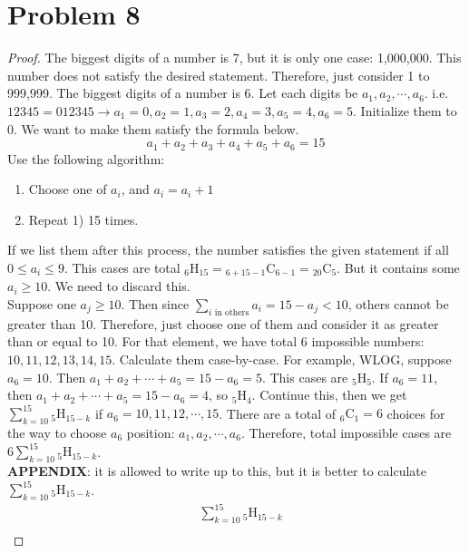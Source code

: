 \section*{Problem 8}
	\begin{proof}
		The biggest digits of a number is 7, but it is only one case: 1,000,000. This number does not satisfy the desired statement. Therefore, just consider 1 to 999,999. The biggest digits of a number is 6. Let each digits be $a_1, a_2, \cdots, a_6$. i.e. $12345 = 012345 \rightarrow a_1 = 0, a_2 = 1, a_3 = 2, a_4 = 3, a_5 = 4, a_6 = 5$. Initialize them to 0. We want to make them satisfy the formula below.
		\begin{equation*}
			a_1 + a_2 + a_3 + a_4 + a_5 + a_6 = 15
		\end{equation*}
		Use the following algorithm:
		\begin{enumerate} [1)]
			\item Choose one of $a_i$, and $a_i = a_i + 1$
			\item Repeat 1) 15 times.
		\end{enumerate}
		If we list them after this process, the number satisfies the given statement if all $0\leq a_i\leq 9$. This cases are total $_{6}\mathrm{H}_{15} = {_{6 + 15 - 1}\mathrm{C}_{6 - 1}} = {_{20}\mathrm{C}_{5}}$. But it contains some $a_i \geq 10$. We need to discard this.\\
		Suppose one $a_j \geq 10$. Then since $\sum\limits_{i\mbox{ in others}} a_i = 15 - a_j < 10$, others cannot be greater than 10. Therefore, just choose one of them and consider it as greater than or equal to 10. For that element, we have total 6 impossible numbers: $10, 11, 12, 13, 14, 15$. Calculate them case-by-case. For example, WLOG, suppose $a_6 = 10$. Then $a_1 + a_2 + \cdots + a_5 = 15 - a_6 = 5$. This cases are $_{5}\mathrm{H}_{5}$. If $a_6 = 11$, then $a_1 + a_2 + \cdots + a_5 = 15 - a_6 = 4$, so $_{5}\mathrm{H}_{4}$. Continue this, then we get $\sum\limits_{k = 10}^{15}{_{5}\mathrm{H}_{15 - k}}$ if $a_6 = 10, 11, 12, \cdots, 15$. There are a total of $_{6}\mathrm{C}_{1} = 6$ choices for the way to choose $a_6$ position: $a_1, a_2, \cdots, a_6$. Therefore, total impossible cases are $6\sum\limits_{k = 10}^{15}{_{5}\mathrm{H}_{15 - k}}$.\\
		{\color{cyan}\textbf{APPENDIX}}: it is allowed to write up to this, but it is better to calculate $\sum\limits_{k = 10}^{15}{_{5}\mathrm{H}_{15 - k}}$.
		\begin{align*}
			& \sum\limits_{k = 10}^{15}{_{5}\mathrm{H}_{15 - k}}\\

\end{align*}
\end{proof}
